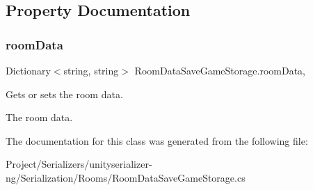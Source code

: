 \subsection{Property Documentation}
\mbox{\label{class_room_data_save_game_storage_a8fef019936e425c2566191550c4aab93}} 
\subsubsection{\texorpdfstring{room\+Data}{roomData}}
{\footnotesize\ttfamily Dictionary$<$string, string$>$ Room\+Data\+Save\+Game\+Storage.\+room\+Data\hspace{0.3cm}{\ttfamily [get]}, {\ttfamily [set]}}



Gets or sets the room data. 

The room data.

The documentation for this class was generated from the following file\+:\begin{DoxyCompactItemize}
\item 
Project/\+Serializers/unityserializer-\/ng/\+Serialization/\+Rooms/Room\+Data\+Save\+Game\+Storage.\+cs\end{DoxyCompactItemize}
